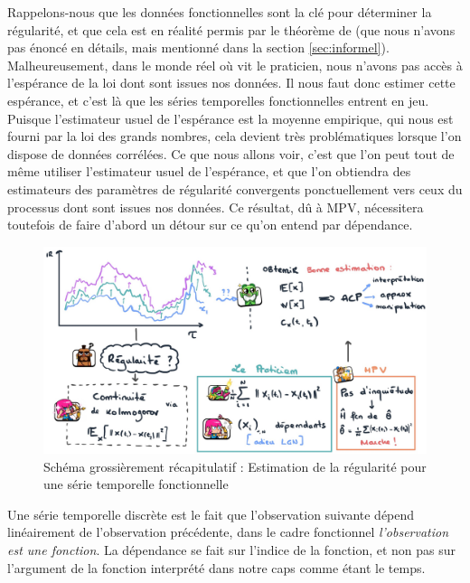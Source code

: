 Rappelons-nous que les données fonctionnelles sont la clé pour déterminer la régularité, et que cela est en réalité permis par le théorème de  (que nous n'avons pas énoncé en détails, mais mentionné dans la section \ref{sec:informel}). Malheureusement, dans le monde réel où vit le praticien, nous n'avons pas accès à l'espérance de la loi dont sont issues nos données. Il nous faut donc estimer cette espérance, et c'est là que les séries temporelles fonctionnelles entrent en jeu. Puisque l'estimateur usuel de l'espérance est la moyenne empirique, qui nous est fourni par la loi des grands nombres, cela devient très problématiques lorsque l'on dispose de données corrélées. Ce que nous allons voir, c'est que l'on peut tout de même utiliser l'estimateur usuel de l'espérance, et que l'on obtiendra des estimateurs des paramètres de régularité convergents ponctuellement vers ceux du processus dont sont issues nos données. Ce résultat, dû à MPV, nécessitera toutefois de faire d'abord un détour sur ce qu'on entend par dépendance.

\begin{figure}[H]
    \centering
    \includegraphics[width=\textwidth]{Images/sketches/schema_ts_estim_reg.jpg}
    \caption{Schéma grossièrement récapitulatif : Estimation de la régularité pour une série temporelle fonctionnelle}
    \label{fig:recap_estim_reg_fts}
\end{figure}



Une série temporelle discrète est le fait que l'observation suivante dépend linéairement de l'observation précédente, dans le cadre fonctionnel \emph{l'observation est une fonction}. La dépendance se fait sur l'indice de la fonction, et non pas sur l'argument de la fonction interprété dans notre caps comme étant le temps.

